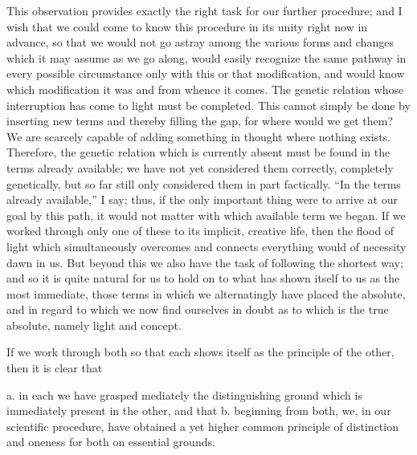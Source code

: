 This observation provides exactly the right task
for our further procedure;
and I wish that we could come to know
this procedure in its unity right now in advance,
so that we would not go astray
among the various forms and changes
which it may assume as we go along,
would easily recognize the same pathway
in every possible circumstance
only with this or that modification,
and would know which modification
it was and from whence it comes.
The genetic relation whose interruption
has come to light must be completed.
This cannot simply be done
by inserting new terms
and thereby filling the gap,
for where would we get them?
We are scarcely capable of adding something in
thought where nothing exists.
Therefore, the genetic relation which is currently absent
must be found in the terms already available;
we have not yet considered them correctly, completely genetically,
but so far still only considered them in part factically.
“In the terms already available,” I say;
thus, if the only important thing were
to arrive at our goal by this path,
it would not matter with which available term we began.
If we worked through only one of these
to its implicit, creative life,
then the flood of light
which simultaneously overcomes and connects
everything would of necessity dawn in us.
But beyond this we also have
the task of following the shortest way;
and so it is quite natural for us to hold on
to what has shown itself to us as the most immediate,
those terms in which we alternatingly have placed the absolute,
and in regard to which we now find ourselves in doubt
as to which is the true absolute,
namely light and concept.

If we work through both
so that each shows itself
as the principle of the other,
then it is clear that

a. in each we have grasped mediately
the distinguishing ground which is immediately
present in the other,
and that
b. beginning from both, we, in our scientific procedure,
have obtained a yet higher common principle
of distinction and oneness for both on essential grounds.

